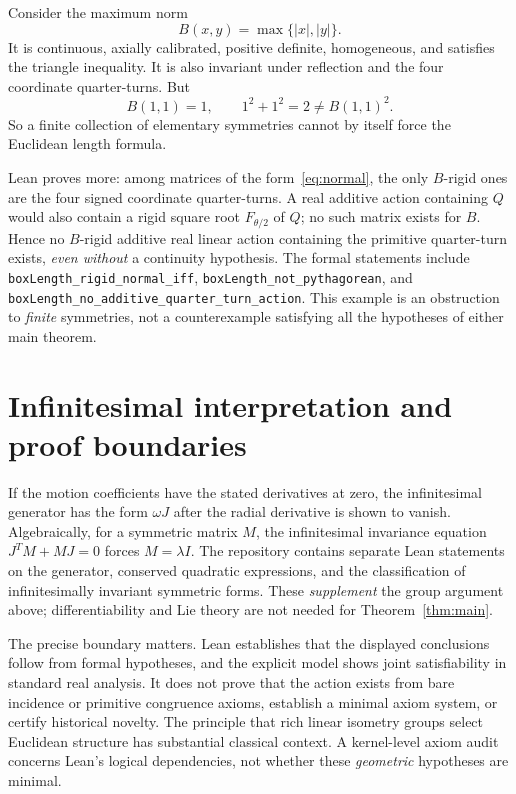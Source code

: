 \documentclass[11pt,a4paper]{article}
\begin{document}
Consider the maximum norm
\[
 B(x,y)=\max\{|x|,|y|\}.
\]
It is continuous, axially calibrated, positive definite,
homogeneous, and satisfies the triangle inequality.
It is also invariant under reflection and the four
coordinate quarter-turns. But
\[
 B(1,1)=1,\qquad 1^2+1^2=2\ne B(1,1)^2.
\]
So a finite collection of elementary symmetries cannot
by itself force the Euclidean length formula.

Lean proves more: among matrices of the form~\eqref{eq:normal},
the only $B$-rigid ones are the four signed coordinate
quarter-turns. A real additive action containing $Q$
would also contain a rigid square root $F_{\theta/2}$
of $Q$; no such matrix exists for $B$. Hence no
$B$-rigid additive real linear action containing
the primitive quarter-turn exists, \emph{even without}
a continuity hypothesis. The formal statements include
\texttt{boxLength\_rigid\_normal\_iff},
\texttt{boxLength\_not\_pythagorean}, and
\texttt{boxLength\_no\_additive\_quarter\_turn\_action}.
This example is an obstruction to \emph{finite}
symmetries, not a counterexample satisfying all
the hypotheses of either main theorem.

\section{Infinitesimal interpretation and proof boundaries}

If the motion coefficients have the stated derivatives
at zero, the infinitesimal generator has the form
$\omega J$ after the radial derivative is shown to
vanish. Algebraically, for a symmetric matrix
$M$, the infinitesimal invariance equation
$J^TM+MJ=0$ forces $M=\lambda I$.
The repository contains separate Lean statements on
the generator, conserved quadratic expressions, and
the classification of infinitesimally invariant
symmetric forms. These \emph{supplement} the group
argument above; differentiability and Lie theory are
not needed for Theorem~\ref{thm:main}.

The precise boundary matters. Lean establishes
that the displayed conclusions follow from formal
hypotheses, and the explicit model shows joint
satisfiability in standard real analysis. It does
not prove that the action exists from bare incidence
or primitive congruence axioms, establish a minimal
axiom system, or certify historical novelty. The
principle that rich linear isometry groups select
Euclidean structure has substantial classical context.
A kernel-level axiom audit concerns Lean's logical
dependencies, not whether these \emph{geometric}
hypotheses are minimal.
\end{document}
